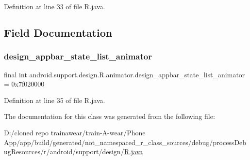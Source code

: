 Definition at line 33 of file R.\+java.


\begin{DoxyCode}{0}

\end{DoxyCode}


\subsection{Field Documentation}
\mbox{\label{classandroid_1_1support_1_1design_1_1_r_1_1animator_a2a7ecd7d450a8c927648ee2ed48886bf}} 
\subsubsection{\texorpdfstring{design\_appbar\_state\_list\_animator}{design\_appbar\_state\_list\_animator}}
{\footnotesize\ttfamily final int android.\+support.\+design.\+R.\+animator.\+design\+\_\+appbar\+\_\+state\+\_\+list\+\_\+animator = 0x7f020000\hspace{0.3cm}{\ttfamily [static]}}



Definition at line 35 of file R.\+java.



The documentation for this class was generated from the following file\+:\begin{DoxyCompactItemize}
\item 
D\+:/cloned repo trainawear/train-\/\+A-\/wear/\+Phone App/app/build/generated/not\+\_\+namespaced\+\_\+r\+\_\+class\+\_\+sources/debug/process\+Debug\+Resources/r/android/support/design/\mbox{\hyperlink{process_debug_resources_2r_2android_2support_2design_2_r_8java}{R.\+java}}\end{DoxyCompactItemize}
